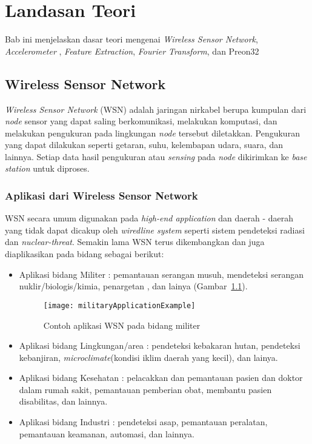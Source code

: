 \chapter{Landasan Teori}
\label{chap:teori}
Bab ini menjelaskan dasar teori mengenai {\it Wireless Sensor Network}, {\it Accelerometer} , {\it Feature Extraction}, {\it Fourier Transform}, dan Preon32 

\section{Wireless Sensor Network}
\label{sec:wirelesssensornetwork} 
{\it Wireless Sensor Network} (WSN) adalah jaringan nirkabel berupa kumpulan dari {\it node} sensor yang dapat saling berkomunikasi, melakukan komputasi, dan melakukan pengukuran pada lingkungan {\it node} tersebut diletakkan. \cite{fundamentals:0:fundamental} Pengukuran yang dapat dilakukan seperti getaran, suhu, kelembapan udara, suara, dan lainnya. Setiap data hasil pengukuran atau {\it sensing} pada {\it node} dikirimkan ke {\it base station} untuk diproses. 

\subsection{Aplikasi dari Wireless Sensor Network \cite{kazem:0:wsn}}
\label{subsec:aplikasiWSN}
WSN secara umum digunakan pada {\it high-end application} dan daerah - daerah yang tidak dapat dicakup oleh {\it wiredline system} seperti sistem pendeteksi radiasi dan {\it nuclear-threat}. Semakin lama WSN terus dikembangkan dan juga diaplikasikan pada bidang sebagai berikut:
\begin{itemize}
	\item Aplikasi bidang Militer : pemantauan serangan musuh, mendeteksi serangan nuklir/biologis/kimia, penargetan , dan lainya (Gambar~\ref{fig:militaryApplicationExample}).
		\begin{figure} [H]
			\centering  
			\texttt{[image: militaryApplicationExample]}  
			\caption[Contoh aplikasi WSN pada bidang militer]{Contoh aplikasi WSN pada bidang militer} 
			\label{fig:militaryApplicationExample} 
		\end{figure} 	
	\item Aplikasi bidang Lingkungan/area : pendeteksi kebakaran hutan, pendeteksi kebanjiran, {\it microclimate}(kondisi iklim daerah yang kecil), dan lainya.
	\item Aplikasi bidang Kesehatan : pelacakkan dan pemantauan pasien dan doktor dalam rumah sakit, pemantauan pemberian obat, membantu pasien disabilitas, dan lainnya.
	\item Aplikasi bidang Industri	: pendeteksi asap, pemantauan peralatan, pemantauan keamanan, automasi, dan lainnya.
\end{itemize}

